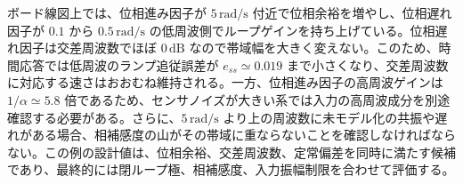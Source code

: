 \begin{example}[遅れ進み補償器による周波数仕様設計]
ボード線図上では、位相進み因子が $5\,\mathrm{rad/s}$ 付近で位相余裕を増やし、位相遅れ因子が $0.1$ から $0.5\,\mathrm{rad/s}$ の低周波側でループゲインを持ち上げている。位相遅れ因子は交差周波数でほぼ $0\,\mathrm{dB}$ なので帯域幅を大きく変えない。このため、時間応答では低周波のランプ追従誤差が $e_{ss}\simeq0.019$ まで小さくなり、交差周波数に対応する速さはおおむね維持される。一方、位相進み因子の高周波ゲインは $1/\alpha\simeq5.8$ 倍であるため、センサノイズが大きい系では入力の高周波成分を別途確認する必要がある。さらに、$5\,\mathrm{rad/s}$ より上の周波数に未モデル化の共振や遅れがある場合、相補感度の山がその帯域に重ならないことを確認しなければならない。この例の設計値は、位相余裕、交差周波数、定常偏差を同時に満たす候補であり、最終的には閉ループ極、相補感度、入力振幅制限を合わせて評価する。
\end{example}

